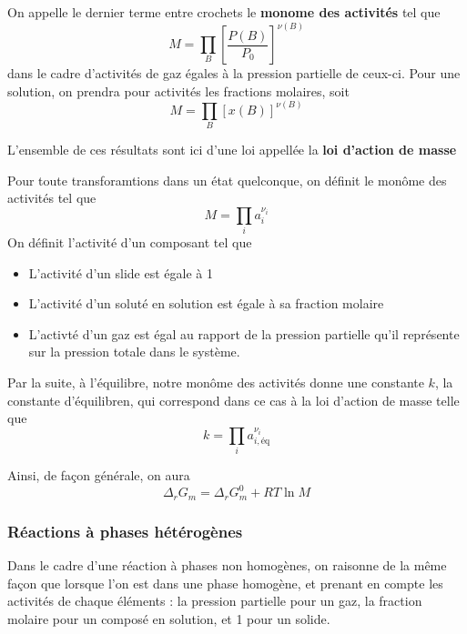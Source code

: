 On appelle le dernier terme entre crochets le \textbf{monome des activités }tel que
\begin{equation}
M=\prod \limits_B \left [\frac{P(B)}{P_0} \right ] ^{\nu(B)}
\end{equation}
dans le cadre d'activités de gaz égales à la pression partielle de ceux-ci. Pour une solution, on prendra pour activités les fractions molaires, soit 
\begin{equation}
M=\prod \limits_B \left [ x(B) \right ] ^{\nu(B)}
\end{equation}

L'ensemble de ces résultats sont ici d'une loi appellée la \textbf{loi d'action de masse}

\begin{theorem}
Pour toute transforamtions dans un état quelconque, on définit le monôme des activités tel que
\begin{equation}
M=\prod_{i} a_{i}^{\nu_{i}}
\end{equation}
On définit l'activité d'un composant tel que
\begin{itemize}
\item L'activité d'un slide est égale à 1
\item L'activité d'un soluté en solution est égale à sa fraction molaire
\item L'activté d'un gaz est égal au rapport de la pression partielle qu'il représente sur la pression totale dans le système.
\end{itemize}
Par la suite, à l'équilibre, notre monôme des activités donne une constante $k$, la constante d'équilibren, qui correspond dans ce cas à la loi d'action de masse telle que
\begin{equation}
k=\prod_{i} a_{i,\text{éq}}^{\nu_{i}}
\end{equation}
\end{theorem}


Ainsi, de façon générale, on aura
\begin{equation}
\Delta_rG_m = \Delta_rG_m^0 + RT \ln M
\end{equation}

\subsubsection{Réactions à phases hétérogènes}

Dans le cadre d'une réaction à phases non homogènes, on raisonne de la même façon que lorsque l'on est dans une phase homogène, et prenant en compte les activités de chaque éléments : la pression partielle pour un gaz, la fraction molaire pour un composé en solution, et 1 pour un solide.\\


